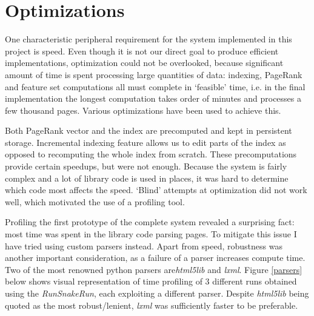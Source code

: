 \documentclass[12pt,notitlepage,twoside]{scrreprt}
\begin{document}
\section{Optimizations}

One characteristic peripheral requirement for the system implemented in this
project is speed.  Even though it is not our direct goal to produce efficient
implementations, optimization could not be overlooked, because significant
amount of time is spent processing large quantities of data: indexing, PageRank
and feature set computations all must complete in `feasible' time, i.e. in the
final implementation the longest computation takes order of minutes and
processes a few thousand pages. Various optimizations have been used to achieve
this. 

Both PageRank vector and the index are precomputed and kept in
persistent storage. Incremental indexing feature allows us to edit parts of the
index as opposed to recomputing the whole index from scratch. These
precomputations provide certain speedups, but were not enough.  Because the
system is fairly complex and a lot of library code is used in places, it was
hard to determine which code most affects the speed. `Blind' attempts at
optimization did not work well, which motivated the use of a profiling tool.

Profiling the first prototype of the complete system revealed a surprising
fact: most time was spent in the library code parsing pages. To mitigate this
issue I have tried using custom parsers instead. Apart from speed, robustness
was another important consideration, as a failure of a parser increases compute
time. Two of the most renowned python parsers are\textit{html5lib} and
\textit{lxml}.  Figure
\ref{parsers} below shows visual representation of time profiling of 3
different runs obtained using the \textit{RunSnakeRun}, each exploiting a
different parser.  Despite \textit{html5lib} being quoted as the most
robust/lenient, \textit{lxml} was sufficiently faster to be preferable.
\end{document}
